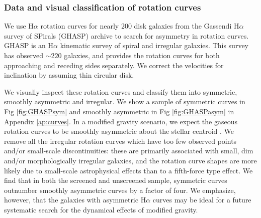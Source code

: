 \documentclass[useAMS,usenatbib,twocolumn]{mn2e}
\newcommand{\ha}{H$\alpha$}
\begin{document}
\subsubsection{Data and visual classification of rotation curves}
We use \ha{} rotation curves for nearly 200 disk
galaxies from  the Gassendi \ha{} survey of SPirals (GHASP) archive
\citep[see][and references therein]{epinat08a} to search for asymmetry in
rotation curves. GHASP is an \ha{} kinematic survey of spiral and
irregular galaxies. This survey has observed $\sim 220$ galaxies, and
provides the rotation curves for both
approaching and receding sides separately. We correct the velocities for
inclination by assuming thin circular disk.

We visually inspect these rotation curves and classify them into symmetric,
smoothly asymmetric and irregular. We show a sample of symmetric curves in Fig
\ref{fig:GHASPsym} and smoothly asymmetric in Fig \ref{fig:GHASPasym} in
Appendix \ref{ap:curves}. In a modified gravity scenario, we expect the gaseous
rotation curves to be smoothly asymmetric about the stellar
centroid \citep{bhuvjake2011}.
We remove all the irregular rotation curves which have too few
observed points and/or small-scale discontinuities: these are primarily
associated with small, dim and/or morphologically irregular galaxies, and the
rotation curve shapes are more likely due to small-scale astrophysical
effects than to a fifth-force type effect.
We find that in both the screened and unscreened sample, symmetric curves
outnumber smoothly asymmetric curves by a factor of four.
We emphasize, however, that the galaxies with asymmetric \ha{} curves may
be ideal for a future systematic search for the dynamical effects of
modified gravity.
\end{document}
